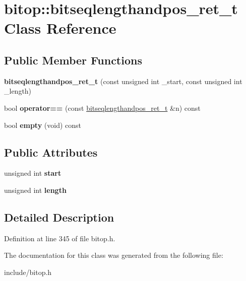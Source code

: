\hypertarget{classbitop_1_1bitseqlengthandpos__ret__t}{\section{bitop\-:\-:bitseqlengthandpos\-\_\-ret\-\_\-t Class Reference}
\label{classbitop_1_1bitseqlengthandpos__ret__t}
}
\subsection*{Public Member Functions}
\begin{DoxyCompactItemize}
\item 
\hypertarget{classbitop_1_1bitseqlengthandpos__ret__t_ac5bb5423694a5b3c4ccb7d096b47a1e1}{{\bfseries bitseqlengthandpos\-\_\-ret\-\_\-t} (const unsigned int \-\_\-start, const unsigned int \-\_\-length)}\label{classbitop_1_1bitseqlengthandpos__ret__t_ac5bb5423694a5b3c4ccb7d096b47a1e1}

\item 
\hypertarget{classbitop_1_1bitseqlengthandpos__ret__t_aa01c0991734ca8f3d725995a9bf32869}{bool {\bfseries operator==} (const \hyperlink{classbitop_1_1bitseqlengthandpos__ret__t}{bitseqlengthandpos\-\_\-ret\-\_\-t} \&n) const }\label{classbitop_1_1bitseqlengthandpos__ret__t_aa01c0991734ca8f3d725995a9bf32869}

\item 
\hypertarget{classbitop_1_1bitseqlengthandpos__ret__t_a9eff391ef9964c4f387912dd2ec6a5a9}{bool {\bfseries empty} (void) const }\label{classbitop_1_1bitseqlengthandpos__ret__t_a9eff391ef9964c4f387912dd2ec6a5a9}

\end{DoxyCompactItemize}
\subsection*{Public Attributes}
\begin{DoxyCompactItemize}
\item 
\hypertarget{classbitop_1_1bitseqlengthandpos__ret__t_af31d1189102270d27e299c752407399b}{unsigned int {\bfseries start}}\label{classbitop_1_1bitseqlengthandpos__ret__t_af31d1189102270d27e299c752407399b}

\item 
\hypertarget{classbitop_1_1bitseqlengthandpos__ret__t_abc61247669dc39db345d2ca4500789a1}{unsigned int {\bfseries length}}\label{classbitop_1_1bitseqlengthandpos__ret__t_abc61247669dc39db345d2ca4500789a1}

\end{DoxyCompactItemize}


\subsection{Detailed Description}


Definition at line 345 of file bitop.\-h.



The documentation for this class was generated from the following file\-:\begin{DoxyCompactItemize}
\item 
include/bitop.\-h\end{DoxyCompactItemize}
